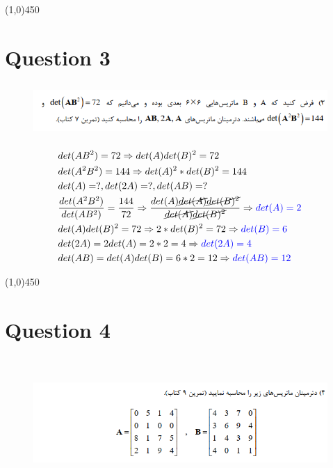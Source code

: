 \documentclass[a4paper,12pt]{article}
\begin{document}
\line(1,0){450}
\newpage

\section {Question 3 }

\begin{figure}[h!]
	\centering
	\includegraphics*[height=2cm]{Q3}
\end{figure}

\begin{doublespace}
	\begin{align*}
		&det(AB^2) = 72 \Rightarrow det(A)det(B)^2 = 72 \\
		&det(A^2B^2) = 144 \Rightarrow det(A)^2 * det(B)^2 = 144\\
		&det(A) = ? , det(2A) = ? , det(AB) = ? \\
		&\frac{det(A^2B^2)}{det(AB^2)} = \frac{144}{72} \Rightarrow  \frac{ det(A) \cancel{det(A)}  \cancel{ det(B)^2}}{\cancel{det(A)} \cancel{det(B)^2}} \Rightarrow \textcolor{blue}{ det(A) = 2}  \\
		& det(A)det(B)^2 = 72 \Rightarrow 2 * det(B)^2 = 72 \Rightarrow \textcolor{blue}{ det(B) = 6} \\
		&det(2A) = 2det(A) = 2 * 2 = 4   \Rightarrow \textcolor{blue}{ det(2A) = 4 }\\
		&det(AB) = det(A) det(B) = 6 * 2 = 12 \Rightarrow \textcolor{blue}{det(AB) = 12 }
	\end{align*}
\end{doublespace}
\line(1,0){450}
\newpage
\section {Question 4 }

\begin{figure}[h!]
	\centering
	\includegraphics*[height=5cm]{Q4}
\end{figure}
\end{document}
